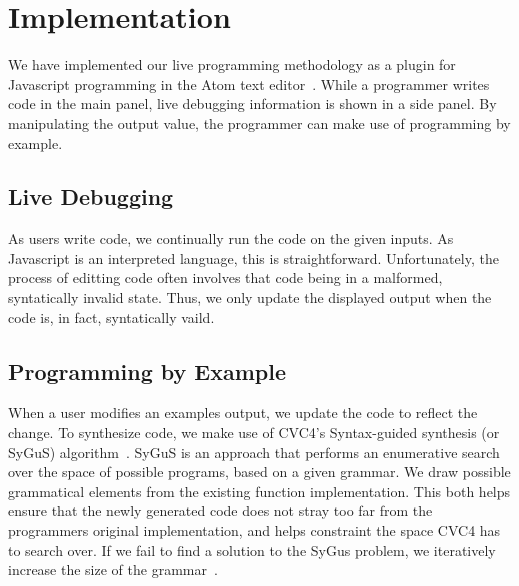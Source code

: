 \section{Implementation}
We have implemented our live programming methodology as a plugin
for Javascript programming in the Atom text editor~\cite{Atom}.
While a programmer writes code in the main panel,
live debugging information is shown in a side panel.
By manipulating the output value,
the programmer can make use of programming by example.

\subsection{Live Debugging}
As users write code, we continually run the code on the given inputs.
As Javascript is an interpreted language, this is straightforward.
Unfortunately, the process of editting code often involves that code
being in a malformed, syntatically invalid state.
Thus, we only update the displayed output when the code is, in fact,
syntatically vaild.~

\subsection{Programming by Example}
When a user modifies an examples output, we update the code to reflect the change.
To synthesize code, we make use of CVC4's Syntax-guided synthesis (or SyGuS) algorithm~\cite{reynolds2017sygus}.
SyGuS is an approach that performs an enumerative search over the space of possible programs,
based on a given grammar.
We draw possible grammatical elements from the existing function implementation.
This both helps ensure that the newly generated code does not stray too far from the programmers original implementation,
and helps constraint the space CVC4 has to search over.
If we fail to find a solution to the SyGus problem, we iteratively increase the size of the grammar~.
